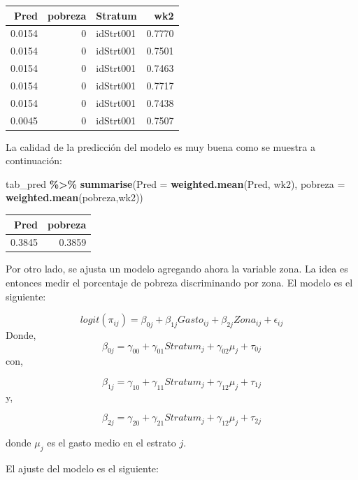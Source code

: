 \documentclass[
  spanish,
  12pt,
]{book}
\newenvironment{Shaded}{\begin{snugshade}}{\end{snugshade}}
\newcommand{\AttributeTok}[1]{\textcolor[rgb]{0.13,0.29,0.53}{#1}}
\newcommand{\FunctionTok}[1]{\textcolor[rgb]{0.13,0.29,0.53}{\textbf{#1}}}
\newcommand{\NormalTok}[1]{#1}
\newcommand{\SpecialCharTok}[1]{\textcolor[rgb]{0.81,0.36,0.00}{\textbf{#1}}}
\begin{document}
\begin{tabular}{r|r|l|r}
\hline
Pred & pobreza & Stratum & wk2\\
\hline
0.0154 & 0 & idStrt001 & 0.7770\\
\hline
0.0154 & 0 & idStrt001 & 0.7501\\
\hline
0.0154 & 0 & idStrt001 & 0.7463\\
\hline
0.0154 & 0 & idStrt001 & 0.7717\\
\hline
0.0154 & 0 & idStrt001 & 0.7438\\
\hline
0.0045 & 0 & idStrt001 & 0.7507\\
\hline
\end{tabular}

La calidad de la predicción del modelo es muy buena como se muestra a continuación:

\begin{Shaded}
\begin{Highlighting}[]
\NormalTok{tab\_pred }\SpecialCharTok{\%\textgreater{}\%} 
  \FunctionTok{summarise}\NormalTok{(}\AttributeTok{Pred =} \FunctionTok{weighted.mean}\NormalTok{(Pred, wk2), }
            \AttributeTok{pobreza =} \FunctionTok{weighted.mean}\NormalTok{(pobreza,wk2))}
\end{Highlighting}
\end{Shaded}

\begin{tabular}{r|r}
\hline
Pred & pobreza\\
\hline
0.3845 & 0.3859\\
\hline
\end{tabular}

Por otro lado, se ajusta un modelo agregando ahora la variable zona. La idea es entonces medir el porcentaje de pobreza discriminando por zona. El modelo es el siguiente:

\[
logit(\pi_{ij})=\beta_{0j}+\beta_{1j}Gasto_{ij}+\beta_{2j}Zona_{ij} +\epsilon_{ij}
\]
Donde,
\[
\beta_{0j} = \gamma_{00}+\gamma_{01}Stratum_{j} + \gamma_{02}\mu_{j}  + \tau_{0j}
\]
con,

\[
\beta_{1j} = \gamma_{10}+\gamma_{11}Stratum_{j} + \gamma_{12}\mu_{j} + \tau_{1j}
\]
y,

\[
\beta_{2j} = \gamma_{20}+\gamma_{21}Stratum_{j} + \gamma_{12}\mu_{j} + \tau_{2j}
\]

donde \(\mu_{j}\) es el gasto medio en el estrato \(j\).

El ajuste del modelo es el siguiente:
\end{document}
